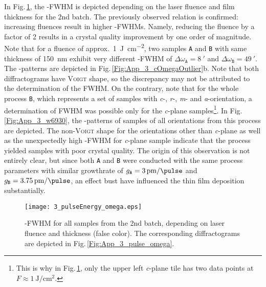 In Fig.\,\ref{Fig:Results_3_pulseOmega}, the \textomega-FWHM is depicted depending on the laser fluence and film thickness for the 2nd batch.
The previously observed relation is confirmed: increasing fluences result in higher \textomega-FWHMs.
Namely, reducing the fluence by a factor of 2 results in a crystal quality improvement by one order of magnitude.
Note that for a fluence of approx.\ \qty{1}{\J\per\cm\squared}, two samples \texttt{A} and \texttt{B} with same thickness of \qty{150}{\nm} exhibit very different \textomega-FWHM of $\Delta\omega_\mathtt{A}=\qty{8}{\arcminute}$ and $\Delta\omega_\mathtt{B}=\qty{49}{\arcminute}$.
The \textomega-patterns are depicted in Fig.\,\ref{Fig:App_3_cOmegaOutlier}b.
Note that both diffractograms have \textsc{Voigt} shape, so the discrepancy may not be attributed to the determination of the \gls{FWHM}.
On the contrary, note that for the whole process \texttt{B}, which represents a set of samples with \textit{c}-, \textit{r}-, \textit{m}- and \textit{a}-orientation, a determination of FWHM was possible only for the \textit{c}-plane samples\footnote{
    This is why in Fig.\,\ref{Fig:Results_3_pulseOmega}, only the upper left \textit{c}-plane tile has two data points at $F\approx\qty{1}{\J\per\cm\squared}$.
}.
In Fig.\,\ref{Fig:App_3_w6930}, the \textomega-patterns of samples of all orientations from this process are depicted.
The non-\textsc{Voigt} shape for the orientations other than \textit{c}-plane as well as the unexpectedly high \textomega-FWHM for \textit{c}-plane sample indicate that the process yielded samples with poor crystal quality.
The origin of this observation is not entirely clear, but since both \texttt{A} and \texttt{B} were conducted with the same process parameters with similar growthrate of $g_\mathtt{A}=\qty{3}{\pm\per\pulse}$ and $g_\mathtt{B}=\qty{3.75}{\pm\per\pulse}$, an effect bust have influenced the thin film deposition substantially.

\begin{figure}
    \centering
    \texttt{[image: 3\_pulseEnergy\_omega.eps]}
    \caption{
        \textomega-FWHM for all samples from the 2nd batch, depending on laser fluence and thickness (false color).
        The corresponding diffractograms are depicted in Fig.\,\ref{Fig:App_3_pulse_omega}. 
    }
    \label{Fig:Results_3_pulseOmega}
\end{figure}